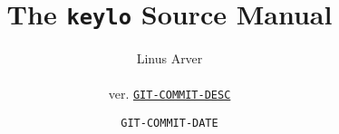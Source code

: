 \documentclass[letterpaper,twoside,12pt]{article}
\begin{document}
\title{The \texttt{keylo} Source Manual}
\author{Linus Arver\\
\\
ver. \href{http://www.github.com/listx/keylo/commit/GIT-COMMIT-HASH}{\texttt{GIT-COMMIT-DESC}}
}
\date{\texttt{GIT-COMMIT-DATE}}
\maketitle
\tableofcontents












%
%
%
%
%
%
\end{document}
